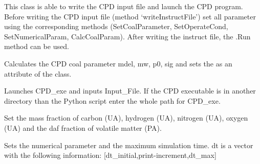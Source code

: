 \documentclass[letterpaper,10pt,english]{sphinxmanual}
\begin{document}
\begin{fulllineitems}
\label{CPDClasses:CPD_Fit_lin_regr.SetterAndLauncher}
This class is able to write the CPD input file and launch the CPD program. Before writing the CPD input file (method `writeInstructFile') set all parameter using the corresponding methods (SetCoalParameter, SetOperateCond, SetNumericalParam, CalcCoalParam). After writing the instruct file, the .Run method can be used.

\begin{fulllineitems}
\label{CPDClasses:CPD_Fit_lin_regr.SetterAndLauncher.CalcCoalParam}
Calculates the CPD coal parameter mdel, mw, p0, sig and sets the as an attribute of the class.

\end{fulllineitems}


\begin{fulllineitems}
\label{CPDClasses:CPD_Fit_lin_regr.SetterAndLauncher.Run}
Launches CPD\_exe and inputs Input\_File. If the CPD executable is in another directory than the Python script enter the whole path for CPD\_exe.

\end{fulllineitems}


\begin{fulllineitems}
\label{CPDClasses:CPD_Fit_lin_regr.SetterAndLauncher.SetCoalParameter}
Set the mass fraction of carbon (UA), hydrogen  (UA), nitrogen (UA), oxygen (UA) and the daf fraction of volatile matter (PA).

\end{fulllineitems}


\begin{fulllineitems}
\label{CPDClasses:CPD_Fit_lin_regr.SetterAndLauncher.SetNumericalParam}
Sets the numerical parameter and the maximum simulation time. dt is a vector with the following information: {[}dt\_initial,print-increment,dt\_max{]}


\end{fulllineitems}
\end{fulllineitems}
\end{document}
